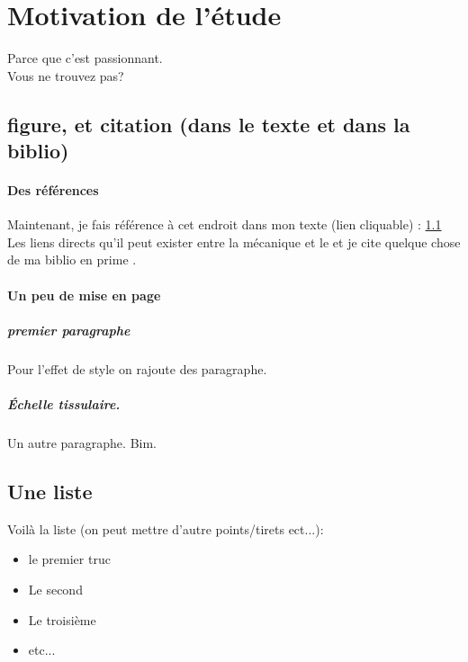 \chapter{Motivation de l'étude}
Parce que c'est passionnant. \\

Vous ne trouvez pas? \\

\newpage

		\section{figure, et citation (dans le texte et dans la biblio)}
		\label{le_nom_pour_faire_référence_a_cette endroit}
			\subsubsection*{Des références}
Maintenant, je fais référence à cet endroit dans mon texte (lien cliquable) : \ref{le_nom_pour_faire_référence_a_cette endroit} \\
Les liens directs qu'il peut exister entre la mécanique et le et je cite quelque chose de ma biblio en prime \cite{Dupont2017}.


			\subsubsection*{Un peu de mise en page}
\paragraph*{premier paragraphe}
Pour l'effet de style on rajoute des paragraphe.

\paragraph*{Échelle tissulaire.}
Un autre paragraphe. Bim.
		\newpage
		\section{Une liste}
				Voilà la liste (on peut mettre d'autre points/tirets ect...): 
\begin{itemize}[label = $\square$]
\item le premier truc
\item Le second
\item Le troisième
\item etc...
\end{itemize}

